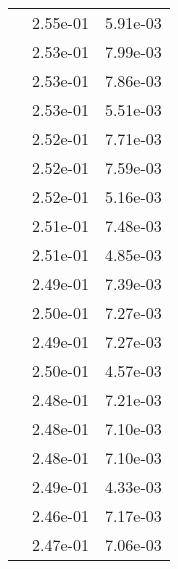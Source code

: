 \begin{table}
\begin{tabular}{c|cc|}
\multicolumn{1}{|c|}{} & \multicolumn{1}{|c|}{  2.55e-01} & \multicolumn{1}{|c|}{  5.91e-03} \\ 
\multicolumn{1}{|c|}{} & \multicolumn{1}{|c|}{  2.53e-01} & \multicolumn{1}{|c|}{  7.99e-03} \\ 
\multicolumn{1}{|c|}{} & \multicolumn{1}{|c|}{  2.53e-01} & \multicolumn{1}{|c|}{  7.86e-03} \\ 
\multicolumn{1}{|c|}{} & \multicolumn{1}{|c|}{  2.53e-01} & \multicolumn{1}{|c|}{  5.51e-03} \\ 
\multicolumn{1}{|c|}{} & \multicolumn{1}{|c|}{  2.52e-01} & \multicolumn{1}{|c|}{  7.71e-03} \\ 
\multicolumn{1}{|c|}{} & \multicolumn{1}{|c|}{  2.52e-01} & \multicolumn{1}{|c|}{  7.59e-03} \\ 
\multicolumn{1}{|c|}{} & \multicolumn{1}{|c|}{  2.52e-01} & \multicolumn{1}{|c|}{  5.16e-03} \\ 
\multicolumn{1}{|c|}{} & \multicolumn{1}{|c|}{  2.51e-01} & \multicolumn{1}{|c|}{  7.48e-03} \\ 
\multicolumn{1}{|c|}{} & \multicolumn{1}{|c|}{  2.51e-01} & \multicolumn{1}{|c|}{  4.85e-03} \\ 
\multicolumn{1}{|c|}{} & \multicolumn{1}{|c|}{  2.49e-01} & \multicolumn{1}{|c|}{  7.39e-03} \\ 
\multicolumn{1}{|c|}{} & \multicolumn{1}{|c|}{  2.50e-01} & \multicolumn{1}{|c|}{  7.27e-03} \\ 
\multicolumn{1}{|c|}{} & \multicolumn{1}{|c|}{  2.49e-01} & \multicolumn{1}{|c|}{  7.27e-03} \\ 
\multicolumn{1}{|c|}{} & \multicolumn{1}{|c|}{  2.50e-01} & \multicolumn{1}{|c|}{  4.57e-03} \\ 
\multicolumn{1}{|c|}{} & \multicolumn{1}{|c|}{  2.48e-01} & \multicolumn{1}{|c|}{  7.21e-03} \\ 
\multicolumn{1}{|c|}{} & \multicolumn{1}{|c|}{  2.48e-01} & \multicolumn{1}{|c|}{  7.10e-03} \\ 
\multicolumn{1}{|c|}{} & \multicolumn{1}{|c|}{  2.48e-01} & \multicolumn{1}{|c|}{  7.10e-03} \\ 
\multicolumn{1}{|c|}{} & \multicolumn{1}{|c|}{  2.49e-01} & \multicolumn{1}{|c|}{  4.33e-03} \\ 
\multicolumn{1}{|c|}{} & \multicolumn{1}{|c|}{  2.46e-01} & \multicolumn{1}{|c|}{  7.17e-03} \\ 
\multicolumn{1}{|c|}{} & \multicolumn{1}{|c|}{  2.47e-01} & \multicolumn{1}{|c|}{  7.06e-03} \\ 

\end{tabular}
\end{table}
